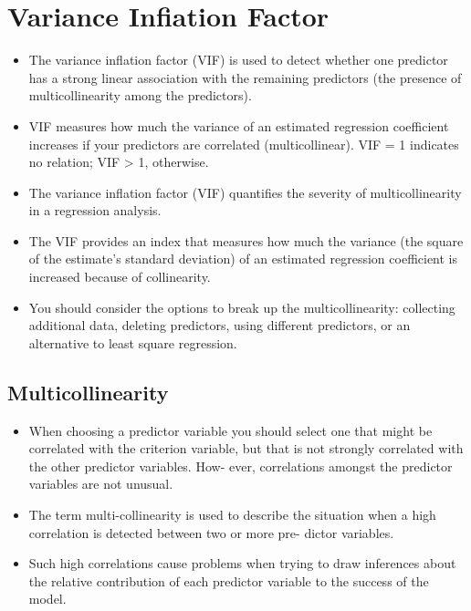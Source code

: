 \documentclass[]{report}
\begin{document}
\section*{Variance Infiation Factor}
\begin{itemize}
\item  The variance inflation factor (VIF) is used to detect whether one predictor has a strong linear association
with the remaining predictors (the presence of multicollinearity among the predictors).
\item  VIF measures how much the variance of an estimated regression coefficient increases if your predictors
are correlated (multicollinear). VIF = 1 indicates no relation; VIF > 1, otherwise.

\item  The variance inflation factor (VIF) quantifies the severity of multicollinearity in a regression analysis.
\item  The VIF provides an index that measures how much the variance (the square of the estimate's standard
deviation) of an estimated regression coefficient is increased because of collinearity.

\item  You should consider the options to break up the multicollinearity: collecting additional data, deleting predictors, using different predictors, or 
an alternative to least square regression.
\end{itemize}




\subsection*{Multicollinearity}
\begin{itemize}
\item When choosing a predictor variable you should select one that might be correlated with the
criterion variable, but that is not strongly correlated with the other predictor variables. How-
ever, correlations amongst the predictor variables are not unusual.
\item  The term multi-collinearity
is used to describe the situation when a high correlation is detected between two or more pre-
dictor variables. 
\item Such high correlations cause problems when trying to draw inferences about
the relative contribution of each predictor variable to the success of the model.
\end{itemize}
\end{document}
